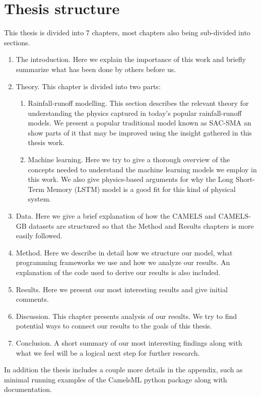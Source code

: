 \section{Thesis structure}
This thesis is divided into 7 chapters, most chapters also being sub-divided into
sections. 
\begin{enumerate}
\item  The introduction. Here we explain the importance of this work and briefly summarize what has been done by others before us.
\item Theory. This chapter is divided into two parts:
    \begin{enumerate}
    \item Rainfall-runoff modelling. This section describes the relevant theory 
        for understanding the physics captured in today's popular rainfall-runoff 
            models. We present a popular traditional model known as SAC-SMA an show 
            parts of it that may be improved using the insight gathered in this 
            thesis work.
    \item Machine learning. Here we try to give a thorough overview of the concepts 
        needed to understand the machine learning models we employ in this work. 
            We also give physics-based arguments for why the Long Short-Term Memory 
            (LSTM) model is a good fit for this kind of physical system.
    \end{enumerate}
    \item Data. Here we give a brief explanation of how the CAMELS and CAMELS-GB 
    datasets are structured so that the Method and Results chapters is more easily followed.
    \item Method. Here we describe in detail how we structure our model, what programming 
        frameworks we use and how we analyze our results. An explanation of the 
        code used to derive our results is also included.
    \item Results. Here we present our most interesting results and give initial comments.
    \item Discussion. This chapter presents analysis of our results. We try to 
        find potential ways to connect our results to the goals of this thesis.
    \item Conclusion. A short summary of our most interesting findings along with 
        what we feel will be a logical next step for further research.
\end{enumerate}
In addition the thesis includes a couple more details in the appendix, such as 
minimal running examples of the CamelsML python package along with documentation.
\nocite{4160265}
\nocite{mckinney-proc-scipy-2010}
\nocite{2020NumPy-Array}
\nocite{2020SciPy-NMeth}
\nocite{NEURIPS2019_9015}
\nocite{Prechelt1998}
\nocite{elemstatlearn}
